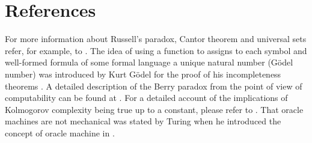 %
%

\section*{References}

For more information about Russell's paradox, Cantor theorem and universal sets refer, for example, to \cite{jech2013set}. The idea of using a function to assigns to each symbol and well-formed formula of some formal language a unique natural number (Gödel number) was introduced by Kurt Gödel for the proof of his incompleteness theorems \cite{godel1931formal}. A detailed description of the Berry paradox from the point of view of computability can be found at \cite{chaitin1995berry}. For a detailed account of the implications of Kolmogorov complexity being true up to a constant, please refer to \cite{li2013introduction}. That oracle machines are not mechanical was stated by Turing when he introduced the concept of oracle machine in \cite{turing1939systems}.



